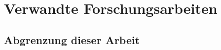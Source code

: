 \chapter{Verwandte Forschungsarbeiten}
\label{ch:relatedwork}
\lipsum[1-2]

%
%
\section{Abgrenzung dieser Arbeit}
\label{sec:relatedwork:differentiation}
\lipsum[1-2]

